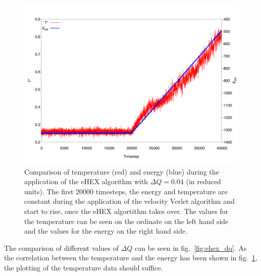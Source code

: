 \documentclass[12pt]{article}
\begin{document}
\begin{figure}[h]
    \begin{center}
        \includegraphics[scale=0.4]{images/ehex_te.pdf}
        \caption{Comparison of temperature (red) and energy (blue) during the application of the eHEX algorithm with $\Delta Q=0.04$ (in reduced units).
                The first 20000 timesteps, the energy and temperature are constant during the application of the velocity Verlet algorithm and start
            to rise, once the eHEX algortithm takes over. The values for the temperature can be seen on the ordinate on the left hand side
            and the values for the energy on the right hand side. }
        \label{fig:ehex_te}
    \end{center}
\end{figure}
The comparison of different values of $\Delta Q$ can be seen in fig.~\ref{fig:ehex_dq}. As the correlation between the temperature and the energy has
been shown in fig.~\ref{fig:ehex_te}, the plotting of the temperature data should suffice. 
\end{document}
